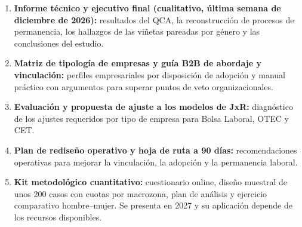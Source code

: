 \begin{enumerate}
    \item \textbf{Informe técnico y ejecutivo final (cualitativo, última semana de diciembre de 2026):} resultados del QCA, la reconstrucción de procesos de permanencia, los hallazgos de las viñetas pareadas por género y las conclusiones del estudio.
    \item \textbf{Matriz de tipología de empresas y guía B2B de abordaje y vinculación:} perfiles empresariales por disposición de adopción y manual práctico con argumentos para superar puntos de veto organizacionales.
    \item \textbf{Evaluación y propuesta de ajuste a los modelos de JxR:} diagnóstico de los ajustes requeridos por tipo de empresa para Bolsa Laboral, OTEC y CET.
    \item \textbf{Plan de rediseño operativo y hoja de ruta a 90 días:} recomendaciones operativas para mejorar la vinculación, la adopción y la permanencia laboral.
    \item \textbf{Kit metodológico cuantitativo:} cuestionario online, diseño muestral de unos 200 casos con cuotas por macrozona, plan de análisis y ejercicio comparativo hombre--mujer. Se presenta en 2027 y su aplicación depende de los recursos disponibles.
\end{enumerate}
